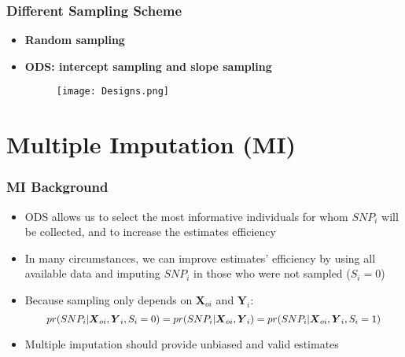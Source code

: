 \documentclass[pdf]{beamer}
\begin{document}
\begin{frame}
\frametitle{Different Sampling Scheme}
\begin{itemize}
	\setlength\itemsep{0.8em}
	\item \textbf{Random sampling}
	\item \textbf{ODS: intercept sampling and slope sampling} 
	\begin{figure}
		\centering
		\texttt{[image: Designs.png]}
	\end{figure}
\end{itemize}
\end{frame}


\section{Multiple Imputation (MI)}

\begin{frame}
\frametitle{MI Background}
\begin{itemize}
	\setlength\itemsep{0.8em}
	\item ODS allows us to select the most informative individuals for whom $SNP_i$ will be collected, and to increase the estimates efficiency
	\item In many circumstances, we can improve estimates’ efficiency by using all available data and imputing $SNP_{i}$ in those who were not sampled ($S_i = 0$)
	\item Because sampling only depends on $\boldsymbol{X}_{oi}$ and $\boldsymbol{Y}_i$:
	\begin{equation}\nonumber
	\resizebox{.9 \textwidth}{!} 
	{
	$pr(SNP_{i} | \boldsymbol{X}_{oi}, \boldsymbol{Y}_{i}, S_i = 0) = pr(SNP_{i} | \boldsymbol{X}_{oi}, \boldsymbol{Y}_{i})
	= pr(SNP_{i} | \boldsymbol{X}_{oi}, \boldsymbol{Y}_{i}, S_i = 1)$
	}
	\end{equation}
	\item Multiple imputation should provide unbiased and valid estimates 
\end{itemize}
\end{frame}
\end{document}
